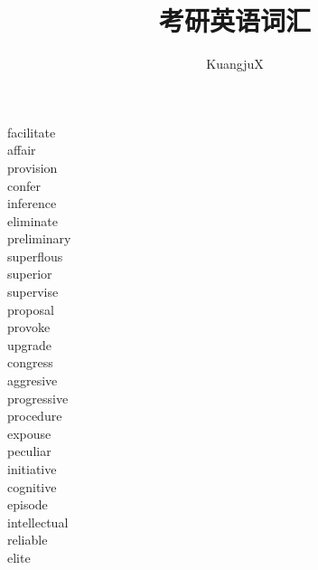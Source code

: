 \documentclass[a4paper, 10pt]{ctexart}
\title{考研英语词汇}
\author{KuangjuX}
\begin{document}
\begin{multicols*}{2}
    \begin{description}

\item[facilitate]

\item[affair]

\item[provision]

\item[confer]

\item[inference]

\item[eliminate]

\item[preliminary]

\item[superflous]

\item[superior]

\item[supervise]

\item[proposal]

\item[provoke]

\item[upgrade]

\item[congress]

\item[aggresive]

\item[progressive]

\item[procedure]

\item[expouse]

\item[peculiar]

\item[initiative]

\item[cognitive]

\item[episode]

\item[intellectual]

\item[reliable]

\item[elite]


\end{description}
\end{multicols*}
\end{document}
